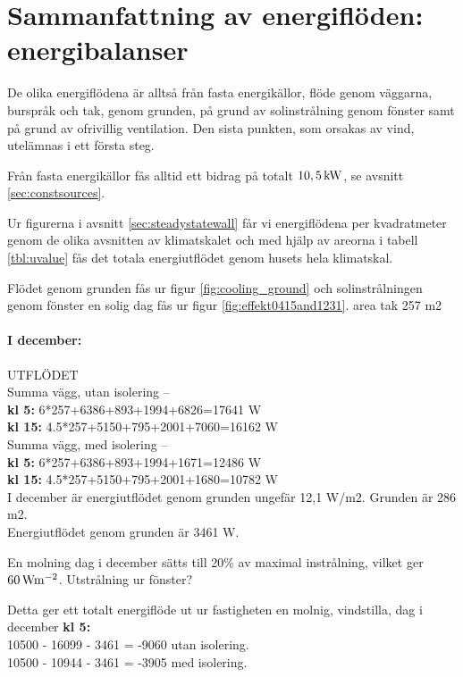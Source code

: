 \section{Sammanfattning av energiflöden: energibalanser}

De olika energiflödena är alltså från fasta energikällor, flöde genom väggarna, burspråk och tak, genom grunden, på grund av solinstrålning genom fönster samt på grund av ofrivillig ventilation. Den sista punkten, som orsakas av vind, utelämnas i ett första steg.

Från fasta energikällor fås alltid ett bidrag på totalt $\unit[10,5]{kW}$, se avsnitt \ref{sec:constsources}.

Ur figurerna i avsnitt \ref{sec:steadystatewall} får vi energiflödena per kvadratmeter genom de olika avsnitten av klimatskalet och med hjälp av areorna i tabell \ref{tbl:uvalue} fås det totala energiutflödet genom husets hela klimatskal.

Flödet genom grunden fås ur figur \ref{fig:cooling_ground} och solinstrålningen genom fönster en solig dag fås ur figur \ref{fig:effekt0415and1231}.
area tak 257 m2

\paragraph{I december:}
UTFLÖDET\\
Summa vägg, utan isolering –\\
\textbf{kl 5:} 6*257+6386+893+1994+6826=17641 W\\
\textbf{kl 15:} 4.5*257+5150+795+2001+7060=16162 W\\

Summa vägg, med isolering –\\
\textbf{kl 5:} 6*257+6386+893+1994+1671=12486 W\\
\textbf{kl 15:} 4.5*257+5150+795+2001+1680=10782 W\\

I december är energiutflödet genom grunden ungefär 12,1 W/m2. Grunden är 286 m2.\\
Energiutflödet genom grunden är 3461 W.

En molning dag i december sätts till 20\% av maximal instrålning, vilket ger $\unit[60]{Wm^{-2}}$. Utstrålning ur fönster?

Detta ger ett totalt energiflöde ut ur fastigheten en molnig, vindstilla, dag i december \textbf{kl 5:}\\
10500 - 16099 - 3461 = -9060 utan isolering.\\
10500 - 10944 - 3461 = -3905 med isolering.\\

